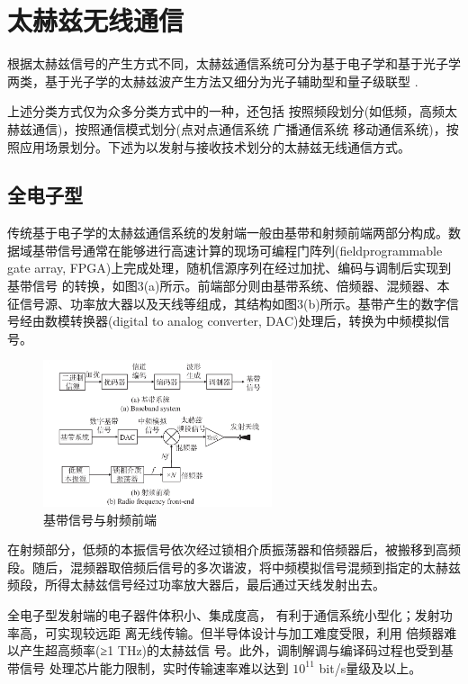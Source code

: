 \section{太赫兹无线通信}

根据太赫兹信号的产生方式不同，太赫兹通信系统可分为基于电子学和基于光子学两类，基于光子学的太赫兹波产生方法又细分为光子辅助型和量子级联型 \cite{deng2022terahertz}.

上述分类方式仅为众多分类方式中的一种，还包括 按照频段划分(如低频，高频太赫兹通信)，按照通信模式划分(点对点通信系统 广播通信系统 移动通信系统)，按照应用场景划分。下述为以发射与接收技术划分的太赫兹无线通信方式。

\subsection{全电子型}

传统基于电子学的太赫兹通信系统的发射端一般由基带和射频前端两部分构成。数据域基带信号通常在能够进行高速计算的现场可编程门阵列(fieldprogrammable gate array, FPGA)上完成处理，随机信源序列在经过加扰、编码与调制后实现到基带信号
的转换，如图3(a)所示。前端部分则由基带系统、倍频器、混频器、本征信号源、功率放大器以及天线等组成，其结构如图3(b)所示。基带产生的数字信号经由数模转换器(digital to analog converter, DAC)处理后，转换为中频模拟信号。

\begin{figure}[ht]
	\centering
	\includegraphics[width=0.6\textwidth]{img/img3.png} %
	\caption{基带信号与射频前端 \cite{shi2024terahertz}}
	\label{fig:example}
\end{figure}

在射频部分，低频的本振信号依次经过锁相介质振荡器和倍频器后，被搬移到高频段。随后，混频器取倍频后信号的多次谐波，将中频模拟信号混频到指定的太赫兹频段，所得太赫兹信号经过功率放大器后，最后通过天线发射出去。

全电子型发射端的电子器件体积小、集成度高， 有利于通信系统小型化；发射功率高，可实现较远距 离无线传输。但半导体设计与加工难度受限，利用 倍频器难以产生超高频率(≥1 THz)的太赫兹信 号。此外，调制解调与编译码过程也受到基带信号 处理芯片能力限制，实时传输速率难以达到 $10^{11}$  bit/s量级及以上。


